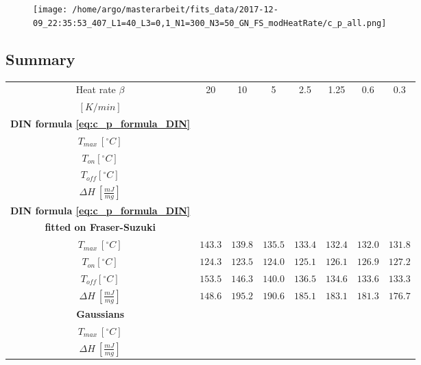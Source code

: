 \documentclass{scrartcl}[12pt, halfparskip]
\numberwithin{equation}{section}
\numberwithin{figure}{section}
\numberwithin{table}{section}
\begin{document}
\begin{figure}[H]
	\centering
	\texttt{[image: /home/argo/masterarbeit/fits\_data/2017-12-09\_22:35:53\_407\_L1=40\_L3=0,1\_N1=300\_N3=50\_GN\_FS\_modHeatRate/c\_p\_all.png]}
	\caption{}
	\label{fig:FS_all_c_p_modHeatRate}
\end{figure}



\subsection{Summary}


\begin{table}[H]
	\centering
	\begin{tabular}{| c | c | c | c | c | c | c | c |} \hline
		Heat rate $\beta$ & 20 & 10 & 5 & 2.5 & 1.25 & 0.6 & 0.3 \\
		$[K/min]$ & & & & & & & \\ \hline
		\textbf{DIN formula \cref{eq:c_p_formula_DIN}} & & & & & & & \\[0.7ex]
		$T_{max} \ [^{\circ}C]$ & & & & & & & \\[0.7ex]
		$T_{on} [^{\circ} C]$ & & & & & & & \\[0.7ex]
		$T_{off} [^{\circ} C]$ & & & & & & & \\[0.7ex]
		$\Delta H \ [\frac{mJ}{mg}]$ & & & & & & & \\ \hline

		\textbf{DIN formula \cref{eq:c_p_formula_DIN}} & & & & & & & \\
		\textbf{fitted on Fraser-Suzuki} & & & & & & & \\
		$T_{max} \ [^{\circ}C]$ & $143.3$ & $139.8$ & $135.5$ & $133.4$ & $132.4$ & $132.0$ & $131.8$ \\[0.7ex]
		$T_{on} [^{\circ} C]$ & $124.3$ & $123.5$ & $124.0$ & $125.1$ & $126.1$ & $126.9$ & $127.2$ \\[0.7ex]
		$T_{off} [^{\circ} C]$ & $153.5$ & $146.3$ & $140.0$ & $136.5$ & $134.6$ & $133.6$ & $133.3$ \\[0.7ex]
		$\Delta H \ [\frac{mJ}{mg}]$ & $148.6$ & $195.2$ & $190.6$ & $185.1$ & $183.1$ & $181.3$ & $176.7$ \\ \hline
		
		\textbf{Gaussians} & & & & & & & \\[0.7ex]
		$T_{max} \ [^{\circ}C]$ & & & & & & & \\[0.7ex]
		$\Delta H \ [\frac{mJ}{mg}]$ & & & & & & & \\ \hline
		

\end{tabular}
\end{table}
\end{document}
